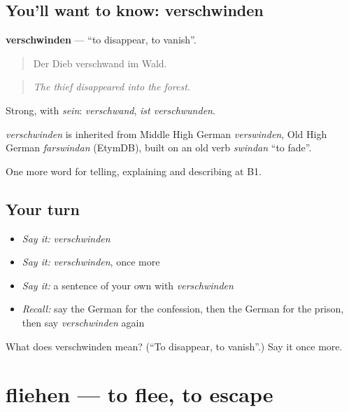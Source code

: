 \subsection*{You'll want to know: verschwinden}
\textbf{verschwinden} — \textquotedblleft{}to disappear, to vanish\textquotedblright{}.

\begin{quote}
Der Dieb verschwand im Wald.
\end{quote}

\begin{quote}
\emph{The thief disappeared into the forest.}
\end{quote}

Strong, with \emph{sein}: \emph{verschwand}, \emph{ist verschwunden}.

\begin{cousinweb}
\emph{verschwinden} is inherited from Middle High German \emph{verswinden}, Old High German \emph{farswindan} (EtymDB), built on an old verb \emph{swindan} \textquotedblleft{}to fade\textquotedblright{}.
\end{cousinweb}

\begin{grammarlens}[title={What you've built}]
One more word for telling, explaining and describing at B1.
\end{grammarlens}

\subsection*{Your turn}
\begin{itemize}
\raggedright
  \item \emph{Say it:} \emph{verschwinden}
  \item \emph{Say it:} \emph{verschwinden}, once more
  \item \emph{Say it:} a sentence of your own with \emph{verschwinden}
  \item \emph{Recall:} say the German for the confession, then the German for the prison, then say \emph{verschwinden} again
\end{itemize}

\begin{tcolorbox}[breakable,colback=teal!4,colframe=teal!35!black,title={Before you move on}]
What does verschwinden mean? (\textquotedblleft{}To disappear, to vanish\textquotedblright{}.) Say it once more.
\end{tcolorbox}
\section[fliehen]{fliehen — to flee, to escape}

